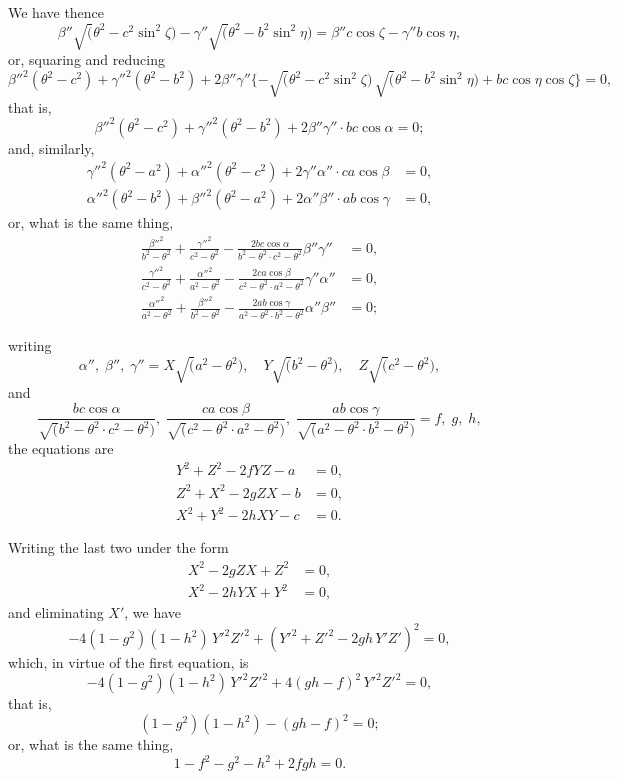\documentclass[11pt,a4paper]{article}
\theoremstyle{plain}
\theoremstyle{definition}
\theoremstyle{remark}
\begin{document}
We have thence
\[
\beta''\surd(\theta^2 - c^2\sin^2\zeta) - \gamma''\surd(\theta^2 - b^2\sin^2\eta) = \beta''c\cos\zeta - \gamma''b\cos\eta,
\]
or, squaring and reducing
\[
\beta''^2(\theta^2-c^2) + \gamma''^2(\theta^2-b^2) + 2\beta''\gamma''\{-\surd(\theta^2-c^2\sin^2\zeta)\,\surd(\theta^2-b^2\sin^2\eta) + bc\cos\eta\cos\zeta\} = 0,
\]
that is,
\[
\beta''^2(\theta^2-c^2) + \gamma''^2(\theta^2-b^2) + 2\beta''\gamma'' \cdot bc\cos\alpha = 0;
\]
and, similarly,
\begin{align*}
\gamma''^2(\theta^2-a^2) + \alpha''^2(\theta^2-c^2) + 2\gamma''\alpha'' \cdot ca\cos\beta &= 0,\\
\alpha''^2(\theta^2-b^2) + \beta''^2(\theta^2-a^2) + 2\alpha''\beta'' \cdot ab\cos\gamma &= 0,
\end{align*}
or, what is the same thing,
\begin{align*}
\frac{\beta''^2}{b^2-\theta^2} + \frac{\gamma''^2}{c^2-\theta^2} - \frac{2bc\cos\alpha}{b^2-\theta^2 \cdot c^2-\theta^2}\beta''\gamma'' &= 0,\\
\frac{\gamma''^2}{c^2-\theta^2} + \frac{\alpha''^2}{a^2-\theta^2} - \frac{2ca\cos\beta}{c^2-\theta^2 \cdot a^2-\theta^2}\gamma''\alpha'' &= 0,\\
\frac{\alpha''^2}{a^2-\theta^2} + \frac{\beta''^2}{b^2-\theta^2} - \frac{2ab\cos\gamma}{a^2-\theta^2 \cdot b^2-\theta^2}\alpha''\beta'' &= 0;
\end{align*}

writing
\[
\alpha'',\; \beta'',\; \gamma'' = X\surd(a^2-\theta^2),\quad Y\surd(b^2-\theta^2),\quad Z\surd(c^2-\theta^2),
\]
and
\[
\frac{bc\cos\alpha}{\surd(b^2-\theta^2 \cdot c^2-\theta^2)},\; \frac{ca\cos\beta}{\surd(c^2-\theta^2 \cdot a^2-\theta^2)},\; \frac{ab\cos\gamma}{\surd(a^2-\theta^2 \cdot b^2-\theta^2)} = f,\; g,\; h,
\]
the equations are
\begin{align*}
Y^2 + Z^2 - 2fYZ - a &= 0,\\
Z^2 + X^2 - 2gZX - b &= 0,\\
X^2 + Y^2 - 2hXY - c &= 0.
\end{align*}

Writing the last two under the form
\begin{align*}
X^2 - 2gZX + Z^2 &= 0,\\
X^2 - 2hYX + Y^2 &= 0,
\end{align*}
and eliminating $X'$, we have
\[
-4(1-g^2)(1-h^2)\,Y'^2Z'^2 + (Y'^2 + Z'^2 - 2gh\,Y'Z')^2 = 0,
\]
which, in virtue of the first equation, is
\[
-4(1-g^2)(1-h^2)\,Y'^2Z'^2 + 4(gh-f)^2\,Y'^2Z'^2 = 0,
\]
that is,
\[
(1-g^2)(1-h^2) - (gh-f)^2 = 0;
\]
or, what is the same thing,
\[
1 - f^2 - g^2 - h^2 + 2fgh = 0.
\]
\end{document}
